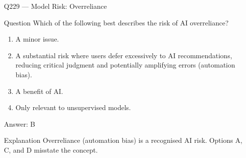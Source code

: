\documentclass[aspectratio=169,8pt]{beamer}
\begin{document}
																																				\begin{frame}{Q229 --- Model Risk: Overreliance}
																																					\begin{block}{Question}
																																						Which of the following best describes the risk of AI overreliance?
																																						\begin{enumerate}
																																							\item A minor issue.
																																							\item A substantial risk where users defer excessively to AI recommendations, reducing critical judgment and potentially amplifying errors (automation bias).
																																							\item A benefit of AI.
																																							\item Only relevant to unsupervised models.
																																						\end{enumerate}  \end{block}
																																						\begin{exampleblock}{Answer: B}\end{exampleblock}
																																						\begin{block}{Explanation}
																																							Overreliance (automation bias) is a recognised AI risk. Options A, C, and D misstate the concept.
																																						\end{block}
																																					\end{frame}
																																					
\end{document}
